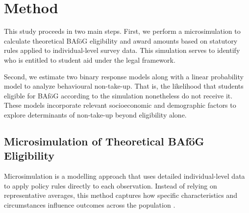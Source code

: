 %
%



\section{Method} 
This study proceeds in two main steps. 
First, we perform a microsimulation to calculate theoretical BAföG eligibility and award amounts based on statutory rules applied to individual-level survey data. 
This simulation serves to identify who is entitled to student aid under the legal framework. 


Second, we estimate two binary response models along with a linear probability model to analyze behavioural non-take-up.
That is, the likelihood that students eligible for BAföG according to the simulation nonetheless do not receive it. 
These models incorporate relevant socioeconomic and demographic factors to explore determinants of non-take-up beyond eligibility alone.

%
%
\subsection{Microsimulation of Theoretical BAföG Eligibility}

Microsimulation is a modelling approach that uses detailed individual-level data to apply policy rules directly to each observation. Instead of relying on representative averages, this method captures how specific characteristics and circumstances influence outcomes across the population \citep{klevmarken_microsimulation_2022}.

